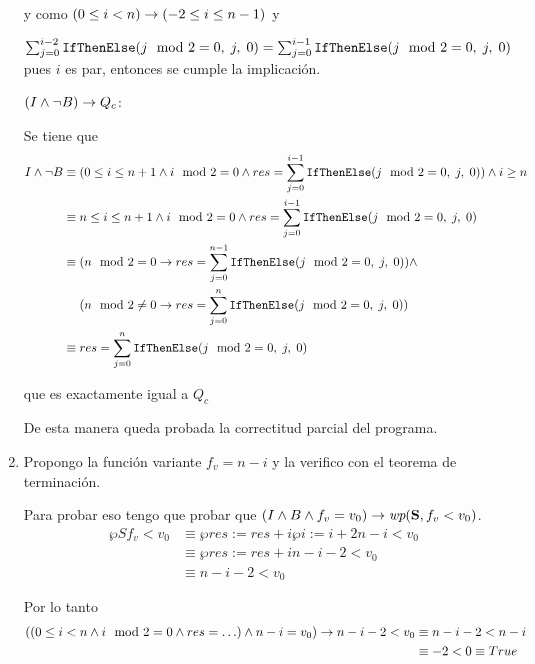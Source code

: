 \begin{enumerate}[label=\alph*)]
          y como $(0 \leq i < n) \rightarrow( -2 \leq i \leq n - 1)$ y \par
          $\sum_{j=0}^{i-2} \text{\normalfont\ttfamily IfThenElse}(j \mod 2 = 0,\;j,\;0) = \sum_{j=0}^{i-1} \text{\normalfont\ttfamily IfThenElse}(j \mod 2 = 0,\;j,\;0)$ pues $i$ es par, entonces se cumple la implicación.
          \bigskip

          $(I \land \neg B) \rightarrow Q_c$:

          Se tiene que
          \begin{align*}
              I \land \neg B & \equiv (0 \leq i \leq n + 1 \land i \mod 2 = 0 \land res = \sum_{j=0}^{i-1} \text{\normalfont\ttfamily IfThenElse}(j \mod 2 = 0,\;j,\;0)) \land i \geq n \\
                             & \equiv n \leq i \leq n + 1 \land i \mod 2 = 0 \land res = \sum_{j=0}^{i-1} \text{\normalfont\ttfamily IfThenElse}(j \mod 2 = 0,\;j,\;0)                  \\
                             & \equiv (n \mod 2 = 0 \rightarrow res = \sum_{j=0}^{n-1} \text{\normalfont\ttfamily IfThenElse}(j \mod 2 = 0,\;j,\;0)) \land                                    \\
                             & \mathrel{\hphantom{\equiv}} (n \mod 2 \neq 0 \rightarrow res = \sum_{j=0}^{n} \text{\normalfont\ttfamily IfThenElse}(j \mod 2 = 0,\;j,\;0))                    \\
                             & \equiv res = \sum_{j=0}^{n} \text{\normalfont\ttfamily IfThenElse}(j \mod 2 = 0,\;j,\;0)
          \end{align*}

          que es exactamente igual a $Q_c$
          \medskip

          De esta manera queda probada la correctitud parcial del programa.

    \item Propongo la función variante $f_v = n - i$ y la verifico con el teorema de terminación.


          Para probar eso tengo que probar que $(I \land B \land f_v = v_0) \Then \wp{S}{f_v < v_0}$.
          \begin{align*}
              \wp{S}{f_v < v_0} & \equiv \wp{res := res + i}{\wp{i := i + 2}{n - i < v_0}} \\
                                & \equiv \wp{res := res + i}{n - i - 2 < v_0}              \\
                                & \equiv n - i - 2 < v_0
          \end{align*}

          Por lo tanto
          \begin{align*}
              ((0 \leq i < n \land i \mod 2 = 0 \land res = \ldots) \land n - i = v_0) \rightarrow n - i - 2 < v_0 & \equiv n - i - 2 < n - i  \\
                                                                                                             & \equiv -2 < 0 \equiv True
          \end{align*}


\end{enumerate}
